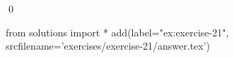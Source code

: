 
\begin{ex} 
  \label{ex:exercise-21}
  
  \qed
\end{ex} 
\begin{python0}
from solutions import *
add(label="ex:exercise-21",
    srcfilename='exercises/exercise-21/answer.tex') 
\end{python0}
